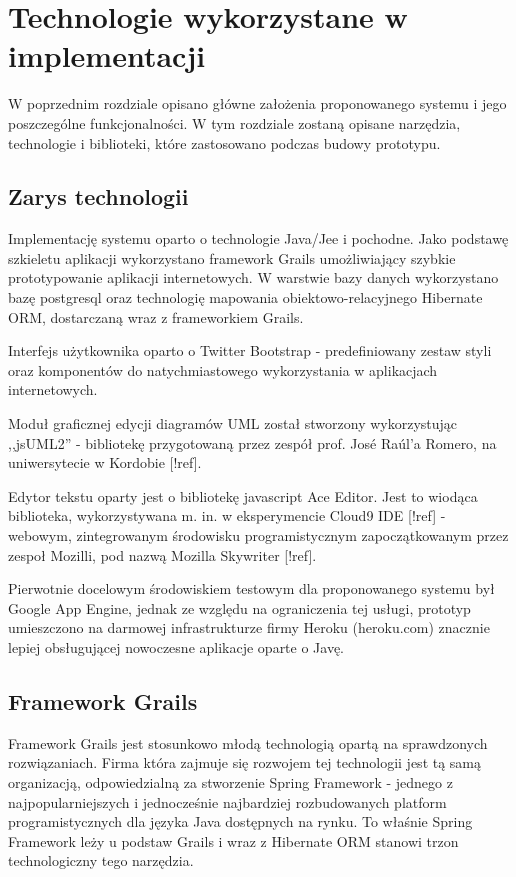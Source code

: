 \chapter{Technologie wykorzystane w implementacji}
  
  W poprzednim rozdziale opisano główne założenia proponowanego systemu i jego poszczególne funkcjonalności. W tym rozdziale zostaną opisane narzędzia, technologie i biblioteki, które zastosowano podczas budowy prototypu.

  \section{Zarys technologii}
    
    Implementację systemu oparto o technologie Java/Jee i pochodne. Jako podstawę szkieletu aplikacji wykorzystano framework Grails umożliwiający szybkie prototypowanie aplikacji internetowych. W warstwie bazy danych wykorzystano bazę postgresql oraz technologię mapowania obiektowo-relacyjnego Hibernate ORM, dostarczaną wraz z frameworkiem Grails. 
    
    Interfejs użytkownika oparto o Twitter Bootstrap - predefiniowany zestaw styli oraz komponentów do natychmiastowego wykorzystania w aplikacjach internetowych. 

    Moduł graficznej edycji diagramów UML został stworzony wykorzystując ,,jsUML2'' - bibliotekę przygotowaną przez zespół prof. José Raúl'a Romero, na uniwersytecie w Kordobie [!ref]. 

    Edytor tekstu oparty jest o bibliotekę javascript Ace Editor. Jest to wiodąca biblioteka, wykorzystywana m. in. w eksperymencie Cloud9 IDE [!ref] - webowym, zintegrowanym środowisku programistycznym zapoczątkowanym przez zespoł Mozilli, pod nazwą Mozilla Skywriter [!ref].
  
    Pierwotnie docelowym środowiskiem testowym dla proponowanego systemu był Google App Engine, jednak ze względu na ograniczenia tej usługi, prototyp umieszczono na darmowej infrastrukturze firmy Heroku (heroku.com) znacznie lepiej obsługującej nowoczesne aplikacje oparte o Javę.

  \section{Framework Grails}
    
    Framework Grails jest stosunkowo młodą technologią opartą na sprawdzonych rozwiązaniach. Firma która zajmuje się rozwojem tej technologii jest tą samą organizacją, odpowiedzialną za stworzenie Spring Framework - jednego z najpopularniejszych i jednocześnie najbardziej rozbudowanych platform programistycznych dla języka Java dostępnych na rynku. To właśnie Spring Framework leży u podstaw Grails i wraz z Hibernate ORM stanowi trzon technologiczny tego narzędzia.

